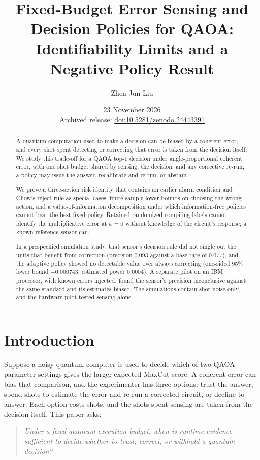 \documentclass[10pt,twocolumn]{article}
\title{Fixed-Budget Error Sensing and Decision Policies for QAOA:\\[2pt]\large Identifiability Limits and a Negative Policy Result}
\author{Zhen-Jun Liu}
\date{23 November 2026\\{\small Archived release: \href{https://doi.org/10.5281/zenodo.24443391}{doi:10.5281/zenodo.24443391}}}
\theoremstyle{definition}
\theoremstyle{remark}
\begin{document}
\maketitle

\begin{abstract}
A quantum computation used to make a decision can be biased by a coherent error, and every shot spent detecting or correcting that error is taken from the decision itself. We study this trade-off for a QAOA top-1 decision under angle-proportional coherent error, with one shot budget shared by sensing, the decision, and any corrective re-run; a policy may issue the answer, recalibrate and re-run, or abstain.

We prove a three-action risk identity that contains an earlier alarm condition and Chow's reject rule as special cases, finite-sample lower bounds on choosing the wrong action, and a value-of-information decomposition under which information-free policies cannot beat the best fixed policy. Retained randomized-compiling labels cannot identify the multiplicative error at $\phi=0$ without knowledge of the circuit's response; a known-reference sensor can.

In a prespecified simulation study, that sensor's decision rule did not single out the units that benefit from correction (precision 0.093 against a base rate of 0.077), and the adaptive policy showed no detectable value over always correcting (one-sided 95\% lower bound $-0.000743$; estimated power 0.0004). A separate pilot on an IBM processor, with known errors injected, found the sensor's precision inconclusive against the same standard and its estimates biased. The simulations contain shot noise only, and the hardware pilot tested sensing alone.
\end{abstract}

\section{Introduction}\label{sec:intro}

Suppose a noisy quantum computer \cite{preskill2018} is used to decide which of two QAOA parameter settings gives the larger expected MaxCut score. A coherent error can bias that comparison, and the experimenter has three options: trust the answer, spend shots to estimate the error and re-run a corrected circuit, or decline to answer. Each option costs shots, and the shots spent sensing are taken from the decision itself. This paper asks:
\begin{quote}\itshape
Under a fixed quantum-execution budget, when is runtime evidence sufficient to decide whether to trust, correct, or withhold a quantum decision?
\end{quote}
\end{document}
